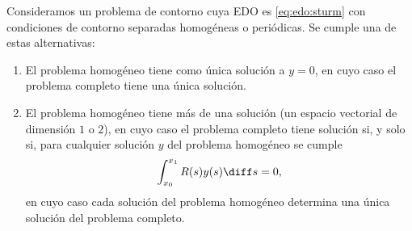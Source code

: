 \documentclass{article}
\begin{document}
\begin{thm}
  Consideramos un problema de contorno cuya EDO es \eqref{eq:edo:sturm} con condiciones de contorno
  separadas homogéneas o periódicas. Se cumple una de estas alternativas:
  \begin{enumerate}
  \item El problema homogéneo tiene como única solución a $y = 0$, en cuyo caso el problema completo
    tiene una única solución.
  \item El problema homogéneo tiene más de una solución (un espacio vectorial de dimensión $1$ o
    $2$), en cuyo caso el problema completo tiene solución si, y solo si, para cualquier solución
    $y$ del problema homogéneo se cumple
    \[\int_{x_0}^{x_1}R(s) y(s) \diff s = 0,\]
    en cuyo caso cada solución del problema homogéneo determina una única solución del problema
    completo.
  \end{enumerate}
\end{thm}
\end{document}
